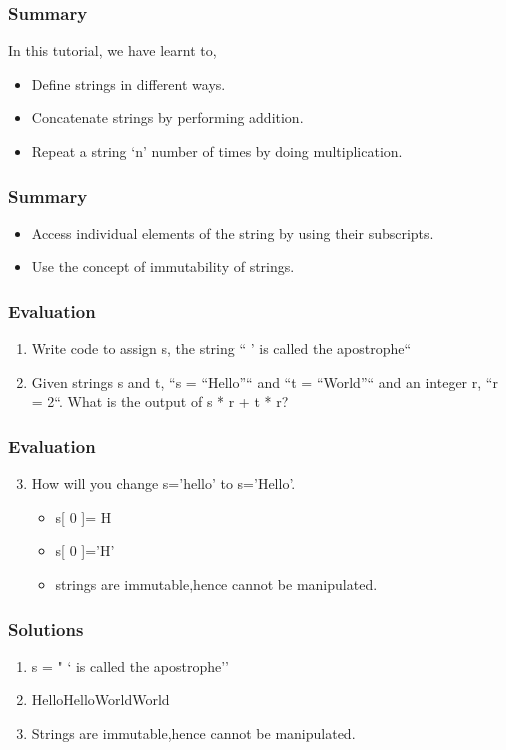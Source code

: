 \documentclass[17pt]{beamer}
\begin{document}
\begin{frame}
\frametitle{Summary}
\label{sec-5}

  In this tutorial, we have learnt to,\pause

\begin{itemize}
\item Define strings in different ways.\pause
\item Concatenate strings by performing addition.\pause
\item Repeat a string `n' number of times by doing multiplication.
\end{itemize}
\end{frame}
\begin{frame}
\frametitle{Summary}
\label{sec-5}
\begin{itemize}
\item Access individual elements of the string by using their subscripts.\pause
\item Use the concept of immutability of strings.
\end{itemize}
\end{frame}
\begin{frame}
\frametitle{Evaluation}
\label{sec-6}
\begin{enumerate}
\item Write code to assign s, the string `` ' is called the apostrophe``
\item Given strings s and t, ``s = ``Hello''`` and ``t = ``World''`` and an
   integer r, ``r = 2``. What is the output of s * r + t * r?
\end{enumerate}
\end{frame}
\begin{frame}
\frametitle{Evaluation}
\label{sec-6}
\begin{enumerate}
\setcounter{enumi}{2}
\item How will you change s='hello' to s='Hello'.
\begin{itemize}
\item s[ 0 ]= H
\item s[ 0 ]='H'
\item strings are immutable,hence cannot be manipulated.
\end{itemize}
\end{enumerate}
\end{frame}
\begin{frame}
\frametitle{Solutions}
\label{sec-7}
\begin{enumerate}
\item s = " ` is called the apostrophe''
\vspace{8pt}
\item HelloHelloWorldWorld
\vspace{8pt}
\item Strings are immutable,hence cannot be manipulated.
\end{enumerate}
\end{frame}
\end{document}
